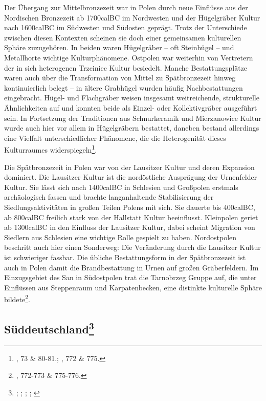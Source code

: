 \documentclass[openany,twoside,twocolumn]{book}
\let\rmarkdownfootnote\footnote%
\def\footnote{\protect\rmarkdownfootnote}
\begin{document}
Der Übergang zur Mittelbronzezeit war in Polen durch neue Einflüsse aus
der Nordischen Bronzezeit ab 1700calBC im Nordwesten und der Hügelgräber
Kultur nach 1600calBC im Südwesten und Südosten geprägt. Trotz der
Unterschiede zwischen diesen Kontexten scheinen sie doch einer
gemeinsamen kulturellen Sphäre zuzugehören. In beiden waren Hügelgräber
-- oft Steinhügel -- und Metallhorte wichtige Kulturphänomene. Ostpolen
war weiterhin von Vertretern der in sich heterogenen Trzciniec Kultur
besiedelt. Manche Bestattungsplätze waren auch über die Transformation
von Mittel zu Spätbronzezeit hinweg kontinuierlich belegt -- in ältere
Grabhügel wurden häufig Nachbestattungen eingebracht. Hügel- und
Flachgräber weisen insgesamt weitreichende, strukturelle Ähnlichkeiten
auf und konnten beide als Einzel- oder Kollektivgräber ausgeführt sein.
In Fortsetzung der Traditionen aus Schnurkeramik und Mierzanowice Kultur
wurde auch hier vor allem in Hügelgräbern bestattet, daneben bestand
allerdings eine Vielfalt unterschiedlicher Phänomene, die die
Heterogenität dieses Kulturraumes widerspiegeln\footnote{\textcite{dabrowski_aeltere_2004},
  73 \& 80-81.; \textcite{czebreszuk_bronze_2013}, 772 \& 775.}.

Die Spätbronzezeit in Polen war von der Lausitzer Kultur und deren
Expansion dominiert. Die Lausitzer Kultur ist die nordöstliche
Ausprägung der Urnenfelder Kultur. Sie lässt sich nach 1400calBC in
Schlesien und Großpolen erstmals archäologisch fassen und brachte
langanhaltende Stabilisierung der Siedlungsaktivitäten in großen Teilen
Polens mit sich. Sie dauerte bis 400calBC, ab 800calBC freilich stark
von der Hallstatt Kultur beeinflusst. Kleinpolen geriet ab 1300calBC in
den Einfluss der Lausitzer Kultur, dabei scheint Migration von Siedlern
aus Schlesien eine wichtige Rolle gespielt zu haben. Nordostpolen
beschritt auch hier einen Sonderweg: Die Veränderung durch die Lausitzer
Kultur ist schwieriger fassbar. Die übliche Bestattungsform in der
Spätbronzezeit ist auch in Polen damit die Brandbestattung in Urnen auf
großen Gräberfeldern. Im Einzugsgebiet des San in Südostpolen trat die
Tarnobrzeg Gruppe auf, die unter Einflüssen aus Steppenraum und
Karpatenbecken, eine distinkte kulturelle Sphäre bildete\footnote{\textcite{czebreszuk_bronze_2013},
  772-773 \& 775-776.}.

\hypertarget{suddeutschland}{%
\subsection[Süddeutschland]{\texorpdfstring{Süddeutschland\footnote{\textcite{falkenstein_development_2012};
  \textcite{falkenstein_zum_2017}; \textcite{jockenhovel_germany_2013};
  \textcite{kreutle_urnenfelderkultur_2007};
  \textcite{wiesner_grabbau_2009}}}{Süddeutschland}}\label{suddeutschland}}
\end{document}
